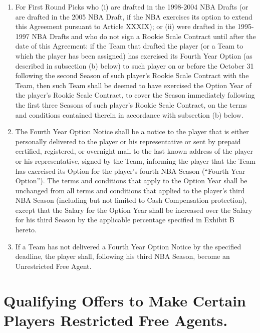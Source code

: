 \documentclass[
]{book}
\providecommand{\tightlist}{%
  \setlength{\itemsep}{0pt}\setlength{\parskip}{0pt}}
\begin{document}
\begin{enumerate}
\def\labelenumi{(\alph{enumi})}
\tightlist
\item
  For First Round Picks who (i) are drafted in the 1998-2004 NBA Drafts (or are drafted in the 2005 NBA Draft, if the NBA exercises its option to extend this Agreement pursuant to Article XXXIX); or (ii) were drafted in the 1995-1997 NBA Drafts and who do not sign a Rookie Scale Contract until after the date of this Agreement: if the Team that drafted the player (or a Team to which the player has been assigned) has exercised its Fourth Year Option (as described in subsection (b) below) to such player on or before the October 31 following the second Season of such player's Rookie Scale Contract with the Team, then such Team shall be deemed to have exercised the Option Year of the player's Rookie Scale Contract, to cover the Season immediately following the first three Seasons of such player's Rookie Scale Contract, on the terms and conditions contained therein in accordance with subsection (b) below.
\item
  The Fourth Year Option Notice shall be a notice to the player that is either personally delivered to the player or his representative or sent by prepaid certified, registered, or overnight mail to the last known address of the player or his representative, signed by the Team, informing the player that the Team has exercised its Option for the player's fourth NBA Season (``Fourth Year Option''). The terms and conditions that apply to the Option Year shall be unchanged from all terms and conditions that applied to the player's third NBA Season (including but not limited to Cash Compensation protection), except that the Salary for the Option Year shall be increased over the Salary for his third Season by the applicable percentage specified in Exhibit B hereto.
\item
  If a Team has not delivered a Fourth Year Option Notice by the specified deadline, the player shall, following his third NBA Season, become an Unrestricted Free Agent.
\end{enumerate}

\hypertarget{qualifying-offers-to-make-certain-players-restricted-free-agents.}{%
\section{Qualifying Offers to Make Certain Players Restricted Free Agents.}\label{qualifying-offers-to-make-certain-players-restricted-free-agents.}}
\end{document}
